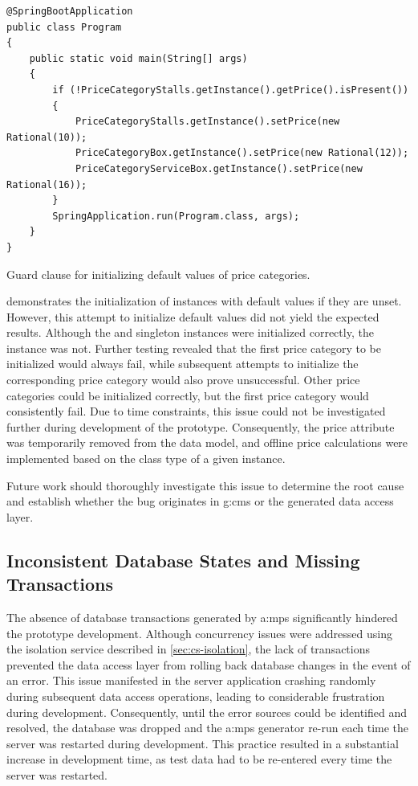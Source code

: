 \begin{listing}[H]
\begin{verbatim}
@SpringBootApplication
public class Program 
{
    public static void main(String[] args) 
    {
        if (!PriceCategoryStalls.getInstance().getPrice().isPresent())
        {
            PriceCategoryStalls.getInstance().setPrice(new Rational(10));
            PriceCategoryBox.getInstance().setPrice(new Rational(12));
            PriceCategoryServiceBox.getInstance().setPrice(new Rational(16));
        }
        SpringApplication.run(Program.class, args);
    }
}
\end{verbatim}
\caption{Guard clause for initializing default values of price categories.}
\label{lst:price-category-initialization}
\end{listing}

 demonstrates the initialization of  instances with default values if they are unset. However, this attempt to initialize default values did not yield the expected results. Although the  and  singleton instances were initialized correctly, the  instance was not. Further testing revealed that the first price category to be initialized would always fail, while subsequent attempts to initialize the corresponding price category would also prove unsuccessful. Other price categories could be initialized correctly, but the first price category would consistently fail. Due to time constraints, this issue could not be investigated further during development of the prototype. Consequently, the price attribute was temporarily removed from the data model, and offline price calculations were implemented based on the class type of a given  instance.

Future work should thoroughly investigate this issue to determine the root cause and establish whether the bug originates in \gls{g:cms} or the generated data access layer.

\subsection{Inconsistent Database States and Missing Transactions}\label{subsec:missing-transactions}

The absence of database transactions generated by \gls{a:mps} significantly hindered the prototype development. Although concurrency issues were addressed using the isolation service described in \cref{sec:cs-isolation}, the lack of transactions prevented the data access layer from rolling back database changes in the event of an error. This issue manifested in the server application crashing randomly during subsequent data access operations, leading to considerable frustration during development. Consequently, until the error sources could be identified and resolved, the database was dropped and the \gls{a:mps} generator re-run each time the server was restarted during development. This practice resulted in a substantial increase in development time, as test data had to be re-entered every time the server was restarted.

